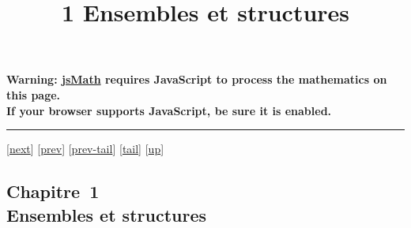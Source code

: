 \documentclass[]{article}
\title{1 Ensembles et structures}
\author{}
\date{}
\begin{document}
\maketitle

\textbf{Warning: \href{http://www.math.union.edu/locate/jsMath}{jsMath}
requires JavaScript to process the mathematics on this page.\\ If your
browser supports JavaScript, be sure it is enabled.}

\begin{center}\rule{3in}{0.4pt}\end{center}

{[}\href{coursch3.html}{next}{]} {[}\href{coursli1.html}{prev}{]}
{[}\href{coursli1.html\#tailcoursli1.html}{prev-tail}{]}
{[}\hyperref[tailcoursch2.html]{tail}{]}
{[}\href{cours.html\#coursch2.html}{up}{]}

\subsection{Chapitre~1\\Ensembles et structures}
\end{document}
